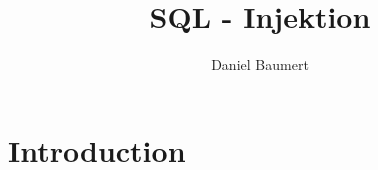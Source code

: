 


\fancyhead{} 
\title{SQL - Injektion}

\author{Daniel Baumert}

\maketitle
\section{Introduction}


